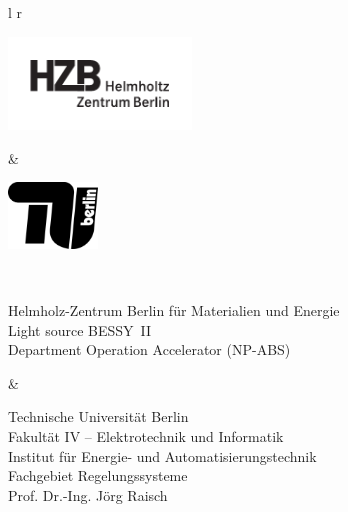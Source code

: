 
\begin{titlingpage}
	\noindent 
    \renewcommand\arraystretch{0}
    \begin{tabulary}{\linewidth}{l r}
        \begin{minipage}{.45\linewidth}
            \includegraphics[height=70pt]{img/hzb_logo_schwarz}
        \end{minipage}
        &
        \begin{minipage}{.45\linewidth}
            \flushright
            \includegraphics[height=50pt]{img/TU_logo_schwarz}
        \end{minipage}
        \\
        \begin{minipage}[t]{.45\linewidth}
            \begin{SingleSpace}
                \scriptsize
                Helmholz-Zentrum Berlin für Materialien und Energie \\
                Light source BESSY~II  \\
                Department Operation Accelerator (NP-ABS)
            \end{SingleSpace}
        \end{minipage}
        &
        \begin{minipage}[t]{.45\linewidth}
            \begin{SingleSpace}
                \scriptsize
                \flushright
                Technische Universität Berlin \\
                Fakultät IV -- Elektrotechnik und Informatik  \\
                Institut für Energie- und Automatisierungstechnik \\
                Fachgebiet Regelungssysteme  \\
                Prof. Dr.-Ing. Jörg Raisch
            \end{SingleSpace}
        \end{minipage}
    \end{tabulary}
    	

\end{titlingpage}

